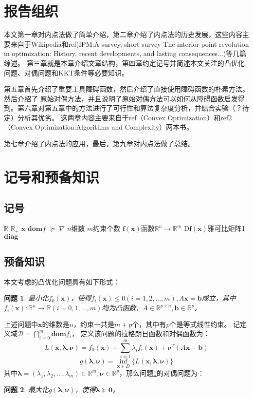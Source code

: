 \documentclass{article}
\newtheorem{problem}{问题}
\begin{document}
\section{报告组织}
本文第一章对内点法做了简单介绍，第二章介绍了内点法的历史发展，这些内容主要来自于Wikipedia和ref(IPM:A survey, short survey The interior-point revolution in optimization: History, recent developments, and lasting consequences...)等几篇综述。
第三章就是本章介绍文章结构，第四章约定记号并简述本文关注的凸优化问题、对偶问题和KKT条件等必要知识。

第五章首先介绍了重要工具障碍函数，然后介绍了直接使用障碍函数的朴素方法。然后介绍了
原始对偶方法，并且说明了原始对偶方法可以如何从障碍函数启发得到。第六章对第五章中的方法进行了可行性和算法复杂度分析，并结合实验（？待定）分析其优劣。
这两章内容主要来自于ref（Convex Optimization）和ref2（Convex Optimization:Algorithms and Complexity）两本书。

第七章介绍了内点法的应用，最后，第九章对内点法做了总结。
\section{记号和预备知识}
\subsection{记号}
$\mathbb{R}$ $\mathbb{R}_+$
$\bm x$ $\textbf{dom}f$
$\succeq$
$\nabla$
$n$维数 $m$约束个数
$\textbf{f}(\bm x)$函数$\mathbb{R}^n\rightarrow\mathbb{R}^m$
$\text{D}\textbf{f}(\bm x)$雅可比矩阵1
$\textbf{diag}$
\subsection{预备知识}
本文考虑的凸优化问题具有如下形式：
\begin{problem}
最小化$f_0(\bm x)$，使得$f_i(\bm x)\le 0(i=1,2,...,m),A\bm x=\bm{b}$成立，其中$f_i(\bm x):\mathbb{R}^n\rightarrow\mathbb{R}(i=0,1,...,m)$均为凸函数，$A\in\mathbb{R}^{p\times n},\bm b\in\mathbb{R}^p$。
\label{general_convex_prob}
\end{problem}

上述问题中$\bm x$的维数是$n$，约束一共是$m+p$个，其中有$p$个是等式线性约束。
记定义域$\mathcal{D}=\bigcap\limits_{i=0}^{m}\textbf{dom}f_i$，
定义该问题的拉格朗日函数和对偶函数为：
\begin{equation}
    L(\bm x,\bm\lambda, \bm\nu)=f_0(\bm x)+\sum\limits_{i=1}^m\lambda_if_i(\bm x)+\bm\nu^T(A\bm x-\bm b)\label{lagrange_function}
\end{equation}
\begin{equation}
    g(\bm\lambda, \bm\nu)=\inf_{\bm x\in D}\{L(\bm x,\bm\lambda, \bm\nu)\}\label{dual_function}
\end{equation}
其中$\bm\lambda=(\lambda_1,\lambda_2,...,\lambda_m)\in\mathbb R^m,\bm\nu\in\mathbb{R}^p$，那么问题\ref{general_convex_prob}的对偶问题为：
\begin{problem}
最大化$g(\bm\lambda,\bm\nu)$，使得$\bm\lambda\succeq\bm 0$。\label{dual_problem}
\end{problem}
\end{document}
